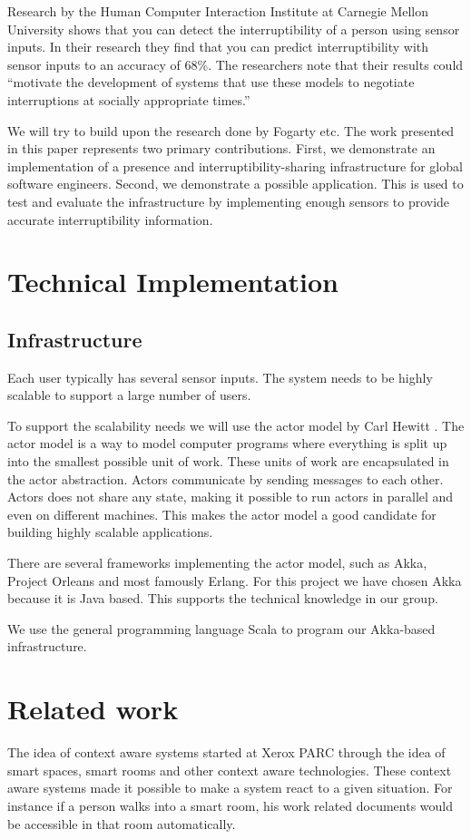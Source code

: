 \documentclass{sigchi}
\begin{document}
Research by the Human Computer Interaction Institute at Carnegie Mellon University \cite{Fogarty:2005:PHI:1057237.1057243} shows that you can detect the interruptibility of a person using sensor inputs.
In their research they find that you can predict interruptibility with sensor inputs to an accuracy of 68\%.
The researchers note that their results could ``motivate the development of systems that use these models to negotiate interruptions at socially appropriate times.''

We will try to build upon the research done by Fogarty etc.
The work presented in this paper represents two primary contributions.
First, we demonstrate an implementation of a presence and interruptibility-sharing infrastructure for global software engineers.
Second, we demonstrate a possible application. This is used to test and evaluate the infrastructure by implementing enough sensors to provide accurate interruptibility information.

\section{Technical Implementation}
\subsection{Infrastructure}
Each user typically has several sensor inputs.
The system needs to be highly scalable to support a large number of users.

To support the scalability needs we will use the actor model by Carl Hewitt \cite{hewitt1973universal}.
The actor model is a way to model computer programs where everything is split up into the smallest possible unit of work.
These units of work are encapsulated in the actor abstraction.
Actors communicate by sending messages to each other.
Actors does not share any state, making it possible to run actors in parallel and even on different machines.
This makes the actor model a good candidate for building highly scalable applications.

There are several frameworks implementing the actor model, such as Akka\cite{akka}, Project Orleans\cite{orleans} and most famously Erlang\cite{erlang}.
For this project we have chosen Akka because it is Java based.
This supports the technical knowledge in our group.

We use the general programming language Scala\cite{scala} to program our Akka-based infrastructure.

\section{Related work}
The idea of context aware systems started at Xerox PARC through the idea of smart spaces, smart rooms and other context aware technologies.
These context aware systems made it possible to make a system react to a given situation.
For instance if a person walks into a smart room, his work related documents would be accessible in that room automatically.
\end{document}
